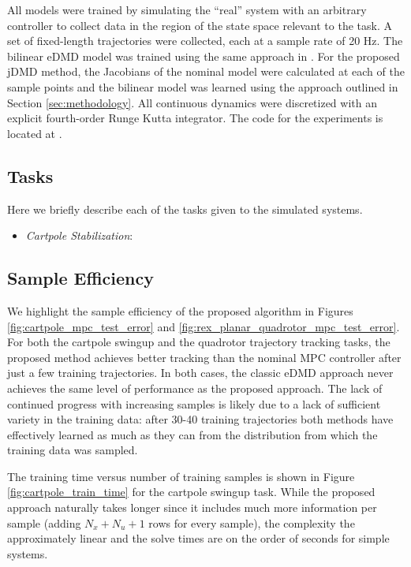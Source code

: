 \documentclass{article}
\begin{document}
All models were trained by simulating the ``real'' system with an arbitrary controller to 
collect data in the region of the state space relevant to the task. A set of fixed-length 
trajectories were collected, each at a sample rate of 20 Hz. The bilinear eDMD model was
trained using the same approach in \cite{Folkestad2021}. For the proposed jDMD method, the
Jacobians of the nominal model were calculated at each of the sample points and the bilinear
model was learned using the approach outlined in Section \ref{sec:methodology}.
All continuous dynamics were discretized with an explicit fourth-order Runge Kutta 
integrator. The code for the experiments is located at 
.

\subsection{Tasks}
Here we briefly describe each of the tasks given to the simulated systems.
\begin{itemize}
  \item \textit{Cartpole Stabilization}: 
\end{itemize}


\subsection{Sample Efficiency}

We highlight the sample efficiency of the proposed algorithm in Figures 
\ref{fig:cartpole_mpc_test_error} and \ref{fig:rex_planar_quadrotor_mpc_test_error}. For
both the cartpole swingup and the quadrotor trajectory tracking tasks, the proposed method
achieves better tracking than the nominal MPC controller after just a few training
trajectories. In both cases, the classic eDMD approach never achieves the same level of
performance as the proposed approach. The lack of continued progress with increasing samples
is likely due to a lack of sufficient variety in the training data: after 30-40 training
trajectories both methods have effectively learned as much as they can from the distribution
from which the training data was sampled.

The training time versus number of training samples is shown in Figure 
\ref{fig:cartpole_train_time} for the cartpole swingup task. While the proposed approach 
naturally takes longer since it includes much more information per sample (adding 
$N_x + N_u + 1$ rows for every sample), the complexity the approximately linear and the 
solve times are on the order of seconds for simple systems.
\end{document}
